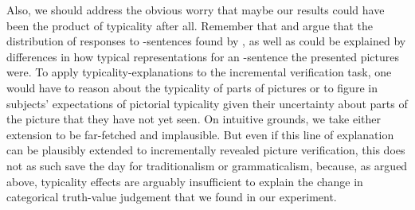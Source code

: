 \documentclass[fleqn,reqno,10pt,draft]{article}
\newcommand{\as}{\acro{as}}
\begin{document}

Also, we should address the obvious worry that maybe our results
could have been the product of typicality after all. Remember that
\citet{Tielvan-Tiel2012:Embedded-Scalar} and
\citet{GeurtsTielvan-Tiel2013:Scalar-expressi} argue that the
distribution of responses to \as-sentences found by
\citet{CliftonDube2010:Embedded-Implic}, as well as
\citet{ChemlaSpector2010:Experimental-Ev} could be explained by
differences in how typical representations for an \as-sentence the
presented pictures were. To apply typicality-explanations to the
incremental verification task, one would have to reason about the
typicality of parts of pictures or to figure in subjects' expectations
of pictorial typicality given their uncertainty about parts of the
picture that they have not yet seen. On intuitive grounds, we take
either extension to be far-fetched and implausible. But even if this
line of explanation can be plausibly extended to incrementally
revealed picture verification, this does not as such save the day for
traditionalism or grammaticalism, because, as argued above, typicality
effects are arguably insufficient to explain the change in categorical
truth-value judgement that we found in our experiment.
\end{document}

